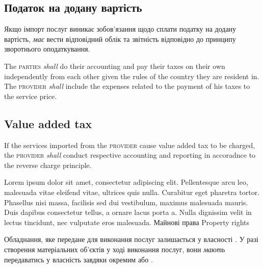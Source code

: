\begin{Form}
\begin{paracol}{3}
{        \subsection{Податок на додану вартість}
        Якщо імпорт послуг  виникає зобов'язання щодо сплати податку на додану вартість,  \textit{має} вести відповідний облік та звітність відповідно до принципу зворотнього оподаткування.
        }
        {The \textsc{parties} \textit{shall} do their accounting and pay their taxes on their own independently from each other given the rules of the country they are resident in. The \textsc{provider} \textit{shall} include the expenses related to the payment of his taxes to the service price.

        \subsection{Value added tax}
        If the services imported from the \textsc{provider} cause value added tax to be charged, the \textsc{provider} \textit{shall} conduct respective accounting and reporting in accoradnce to the reverse charge principle.
        }
        {Lorem ipsum dolor sit amet, consectetur adipiscing elit. Pellentesque arcu leo, malesuada vitae eleifend vitae, ultrices quis nulla. Curabitur eget pharetra tortor. Phasellus nisi massa, facilisis sed dui vestibulum, maximus malesuada mauris. Duis dapibus consectetur tellus, a ornare lacus porta a. Nulla dignissim velit in lectus tincidunt, nec vulputate eros malesuada. }
      \clause
        {Майнові права}
        {Property rights}
        {}
        {
        Обладнання, яке передане  для виконання послуг залишається у власності . У разі створення матеріальних об'єктів у ході виконання послуг, вони \textit{мають} передаватись у власність  завдяки окремим  або .

}
\end{paracol}
\end{Form}
